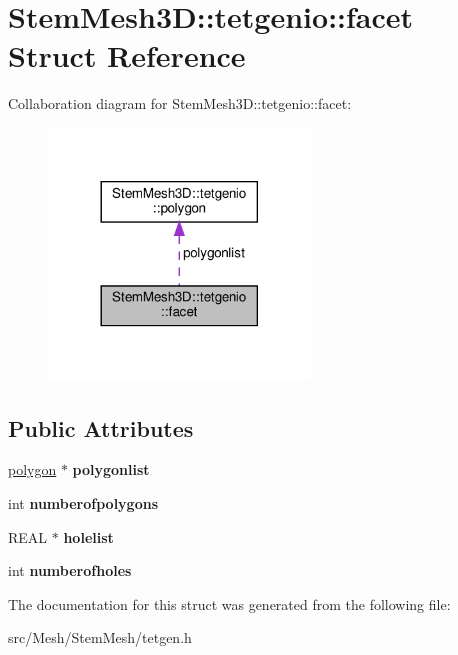\hypertarget{structStemMesh3D_1_1tetgenio_1_1facet}{}\section{Stem\+Mesh3D\+:\+:tetgenio\+:\+:facet Struct Reference}
\label{structStemMesh3D_1_1tetgenio_1_1facet}


Collaboration diagram for Stem\+Mesh3D\+:\+:tetgenio\+:\+:facet\+:\nopagebreak
\begin{figure}[H]
\begin{center}
\leavevmode
\includegraphics[width=197pt]{structStemMesh3D_1_1tetgenio_1_1facet__coll__graph}
\end{center}
\end{figure}
\subsection*{Public Attributes}
\begin{DoxyCompactItemize}
\item 
\mbox{\label{structStemMesh3D_1_1tetgenio_1_1facet_a6dac27e73d3081d96b601fe4b4ace717}} 
\hyperlink{structStemMesh3D_1_1tetgenio_1_1polygon}{polygon} $\ast$ {\bfseries polygonlist}
\item 
\mbox{\label{structStemMesh3D_1_1tetgenio_1_1facet_a025de49c723d8e9c45c924c9cfcc5d44}} 
int {\bfseries numberofpolygons}
\item 
\mbox{\label{structStemMesh3D_1_1tetgenio_1_1facet_a38a6b122d1623b1af93b60fa76a1da51}} 
R\+E\+AL $\ast$ {\bfseries holelist}
\item 
\mbox{\label{structStemMesh3D_1_1tetgenio_1_1facet_afd2634c9adbec1599ced5386435dea6d}} 
int {\bfseries numberofholes}
\end{DoxyCompactItemize}


The documentation for this struct was generated from the following file\+:\begin{DoxyCompactItemize}
\item 
src/\+Mesh/\+Stem\+Mesh/tetgen.\+h\end{DoxyCompactItemize}

